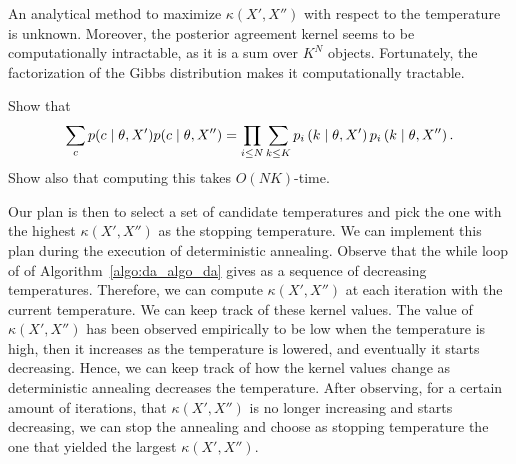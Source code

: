 An analytical method to maximize $\kappa(X', X'')$ with respect to the temperature
is unknown. Moreover, the posterior agreement kernel seems to
be computationally intractable, as it is a sum over $K^N$ objects. Fortunately,
the factorization of the Gibbs distribution makes it computationally
tractable.

\begin{exercise}
Show that
%
\begin{equation}
\sum_{c}p(c \mid \theta, X') p(c \mid \theta, X'') = \prod_{i \leq N}\sum_{k \leq K}p_{i} \left(k\mid \theta, X'\right)p_{i} \left(k\mid \theta, X''\right).
\end{equation}
%
Show also that computing this takes $O(NK)$-time.
\end{exercise}

Our plan is then to select a set of candidate temperatures and pick the
one with the highest $\kappa(X', X'')$ as the stopping temperature. We can implement
this plan during the execution of deterministic annealing. Observe
that the while loop of of Algorithm~\ref{algo:da_algo_da} gives as a sequence of decreasing
temperatures. Therefore, we can compute $\kappa(X', X'')$ at each iteration
with the current temperature. We can keep track of these kernel values.
The value of $\kappa(X', X'')$ has been observed empirically to be low when the
temperature is high, then it increases as the temperature is lowered, and
eventually it starts decreasing. Hence, we can keep track of how the kernel
values change as deterministic annealing decreases the temperature. After
observing, for a certain amount of iterations, that $\kappa(X', X'')$ is no longer
increasing and starts decreasing, we can stop the annealing and choose as
stopping temperature the one that yielded the largest $\kappa(X', X'')$.